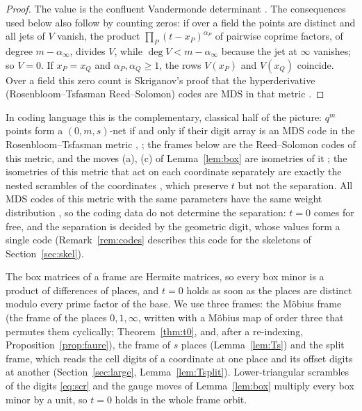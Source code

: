 \documentclass[11pt]{amsart}
\theoremstyle{definition}
\theoremstyle{plain}
\begin{document}
\begin{proof}
The value is the confluent Vandermonde determinant \cite[Sec.~6]{Nie87}. The consequences used below also follow by counting zeros: if over a field the points are distinct and all jets of $V$ vanish, the product $\prod_P(t-x_P)^{\alpha_P}$ of pairwise coprime factors, of degree $m-\alpha_\infty$, divides $V$, while $\deg V<m-\alpha_\infty$ because the jet at $\infty$ vanishes; so $V=0$. If $x_P=x_Q$ and $\alpha_P,\alpha_Q\ge1$, the rows $V(x_P)$ and $V(x_Q)$ coincide. Over a field this zero count is Skriganov's proof that the hyperderivative (Rosenbloom--Tsfasman Reed--Solomon) codes \cite{RT97} are MDS in that metric \cite[Prop.~5.1, Thms.~5.1, 5.2]{Skr01}.
\end{proof}

In coding language this is the complementary, classical half of the picture: $q^m$ points form a $(0,m,s)$-net if and only if their digit array is an MDS code in the Rosenbloom--Tsfasman metric \cite{RT97}, \cite[Thm.~2.1]{Skr01}; the frames below are the Reed--Solomon codes of this metric, and the moves (a), (c) of Lemma~\ref{lem:box} are isometries of it \cite[Rem.~2.2]{Skr01}; the isometries of this metric that act on each coordinate separately are exactly the nested scrambles of the coordinates \cite{PFA09}, which preserve $t$ \cite{Owe95} but not the separation. All MDS codes of this metric with the same parameters have the same weight distribution \cite[Thms.~3.1, 3.2]{Skr01}, so the coding data do not determine the separation: $t=0$ comes for free, and the separation is decided by the geometric digit, whose values form a single code (Remark~\ref{rem:codes} describes this code for the skeletons of Section~\ref{sec:skel}).

The box matrices of a frame are Hermite matrices, so every box minor is a product of differences of places, and $t=0$ holds as soon as the places are distinct modulo every prime factor of the base. We use three frames: the M\"obius frame (the frame of the places $0,1,\infty$, written with a M\"obius map of order three that permutes them cyclically; Theorem~\ref{thm:t0}, and, after a re-indexing, Proposition~\ref{prop:faure}), the frame of $s$ places (Lemma~\ref{lem:Ts}) and the split frame, which reads the cell digits of a coordinate at one place and its offset digits at another (Section~\ref{sec:large}, Lemma~\ref{lem:Tsplit}). Lower-triangular scrambles of the digits \eqref{eq:scr} and the gauge moves of Lemma~\ref{lem:box} multiply every box minor by a unit, so $t=0$ holds in the whole frame orbit.
\end{document}
